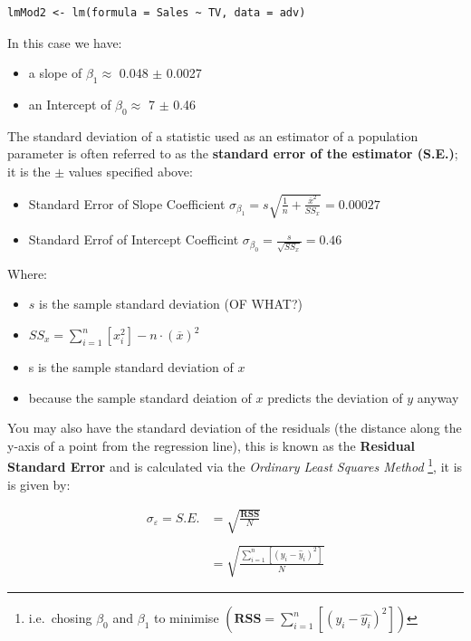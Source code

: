 \documentclass[11pt]{article}
\begin{document}
\begin{verbatim}
lmMod2 <- lm(formula = Sales ~ TV, data = adv)
\end{verbatim}

In this case we have:

\begin{itemize}
\item a slope of \(\beta_1 \approx\) 0.048 \(\pm\) 0.0027
\item an Intercept of \(\beta_0 \approx\) 7 \(\pm\) 0.46
\end{itemize}

The standard deviation of a statistic used as an estimator of a
population parameter is often referred to as the \textbf{standard error of the
estimator (S.E.)}; it is the \(\pm\) values specified above:

\begin{itemize}
\item Standard Error of Slope Coefficient
\(\sigma_{\beta_1} = s\sqrt{\frac{1}{n}+ \frac{\overline{x}^2}{SS_x}} = 0.00027\)
\item Standard Errof of Intercept Coefficint
\(\sigma_{\beta_0} = \frac{s}{\sqrt{SS_x}} = 0.46\)
\end{itemize}

Where:

\begin{itemize}
\item \(s\) is the sample standard deviation (OF WHAT?)
\item \(SS_x = \sum^{n}_{i= 1} \left[ x^2_i \right] - n\cdot \left( \overline{x} \right)^2\)
\item s is the sample standard deviation of \(x\)
\item because the sample standard deiation of \(x\) predicts the deviation of
\(y\) anyway
\end{itemize}

You may also have the standard deviation of the residuals (the distance
along the y-axis of a point from the regression line), this is known as
the \textbf{Residual Standard Error} and is calculated via the \emph{Ordinary Least
Squares Method} \footnote{i.e. chosing \(\beta_0\) and \(\beta_1\) to minimise
\(\left(\textbf{RSS} = \sum^{n}_{i= 1} \left[ \left( y_i - \hat{y_i} \right)^2 \right] \right)\)}, it is is given by:

\begin{align}
 \sigma_{\varepsilon} = S.E. & = \sqrt{\frac{\textbf{RSS}}{N}}\\
 \ \\
 &= \sqrt{\frac{\sum^{n}_{i= 1}   \left[ \left( y_i - \hat{y}_i \right)^2 \right]}{N}}
\end{align}
\end{document}

